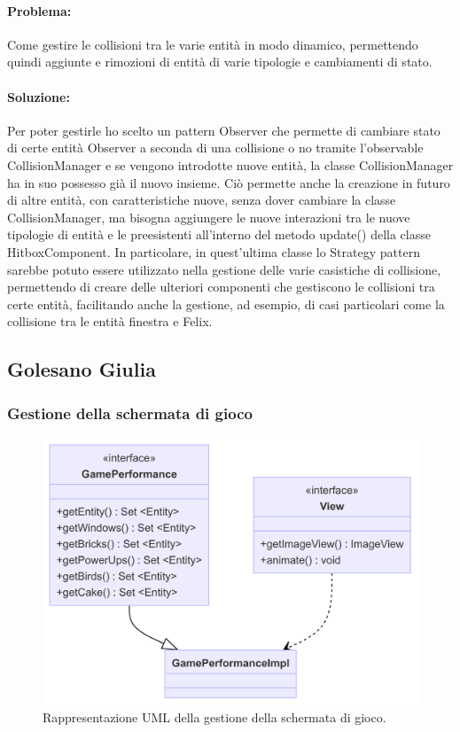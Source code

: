 \documentclass[a4paper,12pt]{report}
\begin{document}
\paragraph{Problema:}
Come gestire le collisioni tra le varie entità in modo dinamico, permettendo quindi aggiunte e rimozioni di entità di varie tipologie e cambiamenti di stato.

\paragraph{Soluzione:}
Per poter gestirle ho scelto un pattern Observer che permette di cambiare stato di certe entità Observer a seconda di una collisione o no tramite l'observable CollisionManager e se vengono introdotte nuove entità, la classe CollisionManager ha in suo possesso già il nuovo insieme. Ciò permette anche la creazione in futuro di altre entità, con caratteristiche nuove, senza dover cambiare la classe CollisionManager, ma bisogna aggiungere le nuove interazioni tra le nuove tipologie di entità e le preesistenti all'interno del metodo update() della classe HitboxComponent. In particolare, in quest'ultima classe lo Strategy pattern sarebbe potuto essere utilizzato nella gestione delle varie casistiche di collisione, permettendo di creare delle ulteriori componenti che gestiscono le collisioni tra certe entità, facilitando anche la gestione, ad esempio, di casi particolari come la collisione tra le entità finestra e Felix.


\subsection{Golesano Giulia}

\subsubsection{Gestione della schermata di gioco }

\begin{figure}[H]
\centering{}
\includegraphics[width=\textwidth]{img/game.png}
\caption{Rappresentazione UML della gestione della schermata di gioco.}
\end{figure}
\end{document}
